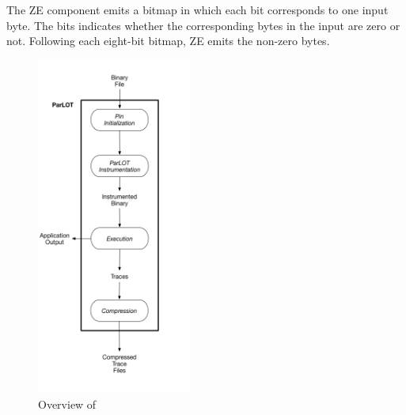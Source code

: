 The ZE component emits a bitmap in which each bit corresponds to one input byte. The bits indicates whether the corresponding bytes in the input are zero or not. Following each eight-bit bitmap, ZE emits the non-zero bytes.



\begin{figure}[!t]
\centering
\includegraphics[width=2in]{overview.png}
\caption{ Overview of \parlot}
\label{overview}
\end{figure}
